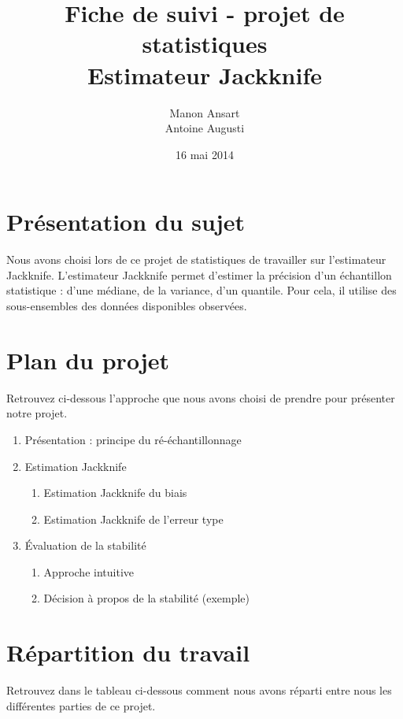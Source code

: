 \documentclass[a4paper,10pt]{article}
\title {Fiche de suivi - projet de statistiques\\ Estimateur Jackknife}
\author{Manon Ansart\\ Antoine Augusti}
\date{16 mai 2014}
\begin{document}
	\maketitle

	\section{Présentation du sujet}
	Nous avons choisi lors de ce projet de statistiques de travailler sur l'estimateur Jackknife. L'estimateur Jackknife permet d'estimer la précision d'un échantillon statistique : d'une médiane, de la variance, d'un quantile. Pour cela, il utilise des sous-ensembles des données disponibles observées.

	\section{Plan du projet}
	Retrouvez ci-dessous l'approche que nous avons choisi de prendre pour présenter notre projet.

	\vspace{10px}
	\begin{enumerate}
		\item Présentation : principe du ré-échantillonnage
		\item Estimation Jackknife
		\begin{enumerate}
			\item Estimation Jackknife du biais
			\item Estimation Jackknife de l'erreur type
		\end{enumerate}
		\item Évaluation de la stabilité
		\begin{enumerate}
			\item Approche intuitive
			\item Décision à propos de la stabilité (exemple)
		\end{enumerate}
	\end{enumerate}


	\section{Répartition du travail}
	Retrouvez dans le tableau ci-dessous comment nous avons réparti entre nous les différentes parties de ce projet.
\end{document}
